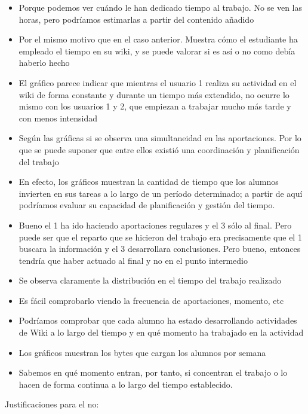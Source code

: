 \begin{itemize}
\item Porque podemos ver cuándo le han dedicado tiempo al trabajo. No se ven las horas, pero podríamos estimarlas a partir del contenido añadido
\item Por el mismo motivo que en el caso anterior. Muestra cómo el estudiante ha empleado el tiempo en su wiki, y se puede valorar si es así o no como debía haberlo hecho
\item El gráfico parece indicar que mientras el usuario 1 realiza su actividad en el wiki de forma constante y durante un tiempo más extendido, no ocurre lo mismo con los usuarios 1 y 2, que empiezan a trabajar mucho más tarde y con menos intensidad
\item Según las gráficas si se observa una simultaneidad en las aportaciones. Por lo que se puede suponer que entre ellos existió una coordinación y planificación del trabajo
\item En efecto, los gráficos muestran la cantidad de tiempo que los alumnos invierten en sus tareas a lo largo de un período determinado; a partir de aquí podríamos evaluar su capacidad de planificación y gestión del tiempo.
\item Bueno el 1 ha ido haciendo aportaciones regulares y el 3 sólo al final. Pero puede ser que el reparto que se hicieron del trabajo era precisamente que el 1 buscara la información y el 3 desarrollara conclusiones. Pero bueno, entonces tendría que haber actuado al final y no en el punto intermedio
\item Se observa claramente la distribución en el tiempo del trabajo realizado
\item Es fácil comprobarlo viendo la frecuencia de aportaciones, momento, etc
\item Podríamos comprobar que cada alumno ha estado desarrollando actividades de Wiki a lo largo del tiempo y en qué momento ha trabajado en la actividad
\item Los gráficos muestran los bytes que cargan los alumnos por semana
\item Sabemos en qué momento entran, por tanto, si concentran el trabajo o lo hacen de forma continua a lo largo del tiempo establecido.
\end{itemize}

Justificaciones para el no:

